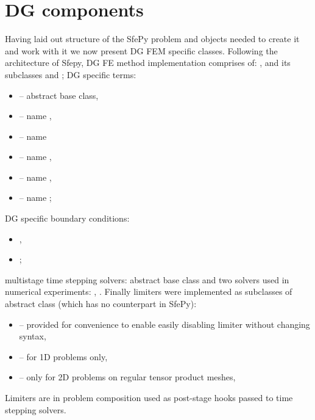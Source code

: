 
\section{DG components}
Having laid out structure of the SfePy problem and objects needed to create it and work 
with it we now present DG FEM
specific classes. Following the architecture of Sfepy, DG FE method implementation 
comprises 
of: , 
 and its subclasses  
and 
;
DG specific terms: 
\begin{itemize}
	\item {} -- abstract base class,
	\item {} -- name ,
	\item {} -- name
	\item {} -- name ,
	\item {} -- name ,
	\item {} --  name 
	;
\end{itemize}
DG specific boundary conditions:
\begin{itemize}
	\item {},
	\item {};
\end{itemize}
multistage time stepping solvers: abstract base class  
and two solvers used in numerical 
experiments: , . Finally limiters 
were implemented as subclasses of  abstract class (which has 
no counterpart in SfePy):
\begin{itemize}
	\item {} -- provided for convenience to enable 
	easily disabling limiter without changing 
	syntax,
	\item {} -- for 1D problems only,
	\item {} -- only for 2D problems on regular tensor product 
	meshes,
\end{itemize} 
Limiters are in problem composition used as post-stage hooks passed to time 
stepping solvers.
